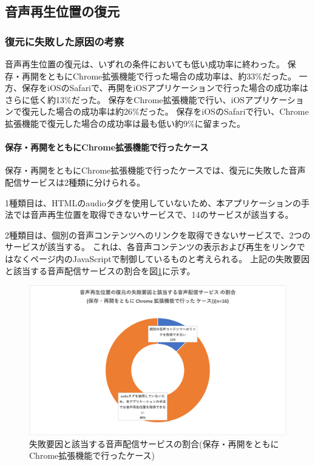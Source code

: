 \subsection{音声再生位置の復元}
\subsubsection{復元に失敗した原因の考察}
音声再生位置の復元は、いずれの条件においても低い成功率に終わった。
保存・再開をともにChrome拡張機能で行った場合の成功率は、約33\%だった。
一方、保存をiOSのSafariで、再開をiOSアプリケーションで行った場合の成功率はさらに低く約13\%だった。
保存をChrome拡張機能で行い、iOSアプリケーションで復元した場合の成功率は約26\%だった。
保存をiOSのSafariで行い、Chrome拡張機能で復元した場合の成功率は最も低い約9\%に留まった。

\paragraph{保存・再開をともにChrome拡張機能で行ったケース}

保存・再開をともにChrome拡張機能で行ったケースでは、復元に失敗した音声配信サービスは2種類に分けられる。

1種類目は、HTMLのaudioタグを使用していないため、本アプリケーションの手法では音声再生位置を取得できないサービスで、14のサービスが該当する。

2種類目は、個別の音声コンテンツへのリンクを取得できないサービスで、2つのサービスが該当する。
これは、各音声コンテンツの表示および再生をリンクではなくページ内のJavaScriptで制御しているものと考えられる。
上記の失敗要因と該当する音声配信サービスの割合を図\ref{fig:evl-consideration-audio-cause-ratio-chrome}に示す。

\begin{figure}[htbp]
  \label{fig:evl-consideration-audio-cause-ratio-chrome}
  \begin{center}
    \includegraphics[bb=0 0 711.77777778 415.55555556,width=15cm]{img/060_evaluation/consideration/audio/cause-ratio-chrome.pdf}
  \end{center}
  \caption{失敗要因と該当する音声配信サービスの割合(保存・再開をともにChrome拡張機能で行ったケース)}
\end{figure}

